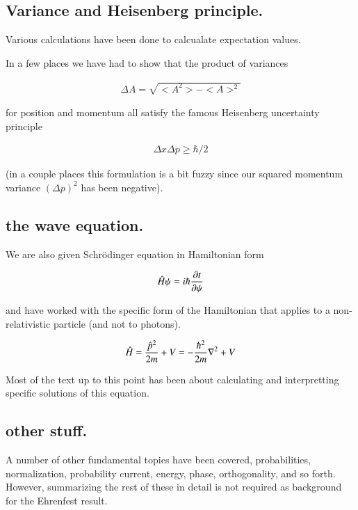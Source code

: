 \documentclass{article}
\begin{document}
\subsection{ Variance and Heisenberg principle. }

Various calculations have been done to calcualate expectation values.

In a few places we have had to show that the product of variances

\begin{align*}
\Delta A = \sqrt{<A^2> - <A>^2}
\end{align*}

for position and momentum all satisfy the famous Heisenberg uncertainty
principle

\begin{align*}
\Delta x \Delta p \ge \hbar/2
\end{align*}

(in a couple places this formulation is a bit fuzzy since our squared
momentum variance $(\Delta p)^2$ has been negative).

\subsection{ the wave equation. }

We are also given Schr\"{o}dinger equation in Hamiltonian form

\begin{align*}
\hat{H} \psi = i \hbar \frac{\partial{t}}{\partial {\psi}}
\end{align*}

and have worked with the specific form of the Hamiltonian that applies to
a non-relativistic particle (and not to photons).

\begin{align*}
\hat{H} = \frac{\hat{p}^2}{2m} + V = -\frac{\hbar^2}{2m} \nabla^2 + V
\end{align*}

Most of the text up to this point has been about calculating and interpretting
specific solutions of this equation.

\subsection{ other stuff. }

A number of other fundamental topics have been covered, probabilities, normalization, probability current, energy, phase, orthogonality, and so forth.  However, summarizing the rest of these in detail is not required as 
background for the Ehrenfest result.
\end{document}
